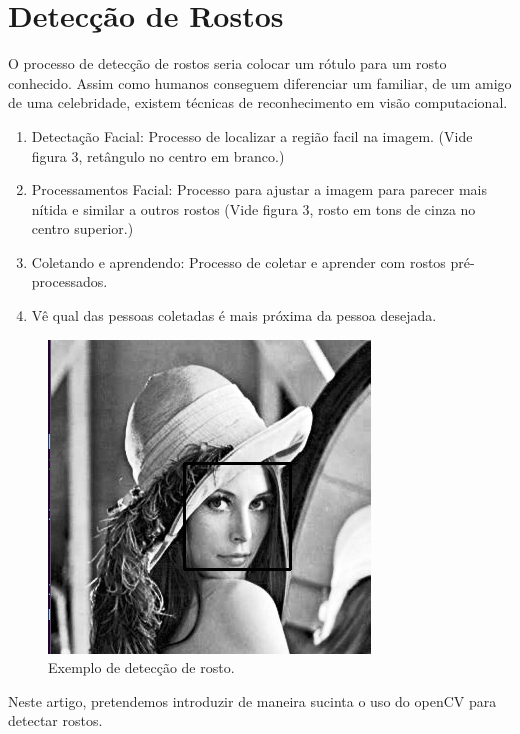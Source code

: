 \documentclass[12pt]{article}
\def\code#1{\texttt{#1}}
\begin{document}
	\section{Detecção de Rostos}
	
	O processo de detecção de rostos seria colocar um rótulo para um rosto conhecido. Assim como humanos conseguem diferenciar um familiar, de um amigo de uma celebridade, existem técnicas de reconhecimento em visão computacional.
	
	\begin{enumerate}
		\item Detectação Facial: Processo de localizar a região facil na imagem. (Vide figura 3, retângulo no centro em branco.)
		\item Processamentos Facial: Processo para ajustar a imagem para parecer mais nítida e similar a outros rostos (Vide figura 3, rosto em tons de cinza no centro superior.)
		\item Coletando e aprendendo: Processo de coletar e aprender com rostos pré-processados.
		\item Vê qual das pessoas coletadas é mais próxima da pessoa desejada.
	\end{enumerate}\def\code#1{\texttt{#1}}
	
	\begin{figure}[ht!]
		\centering
		\includegraphics[width=\textwidth]{detected_face}
		\caption{Exemplo de detecção de rosto.}
	\end{figure}
	\newpage
	Neste artigo, pretendemos introduzir de maneira sucinta o uso do openCV para detectar rostos.
	
\end{document}
